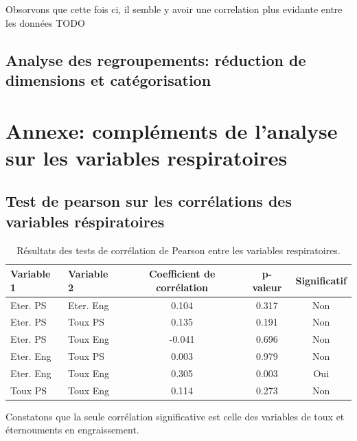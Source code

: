 \documentclass{article}
\begin{document}
Obsorvons que cette fois ci, il semble y avoir une correlation plus evidante entre les données 
TODO




\subsection{Analyse des regroupements: réduction de dimensions et catégorisation}

\newpage
\appendix

\section{Annexe: compléments de l'analyse sur les variables respiratoires}
\subsection{Test de pearson sur les corrélations des variables réspiratoires}\label{annexe:pearson}

\begin{table}[ht]
    \centering
    \begin{tabular}{llccc}
    \toprule
    \textbf{Variable 1} & \textbf{Variable 2} & \textbf{Coefficient de corrélation} & \textbf{p-valeur} & \textbf{Significatif} \\
    \midrule
    Eter. PS & Eter. Eng & 0.104 & 0.317 & Non \\
    Eter. PS & Toux PS & 0.135 & 0.191 & Non \\
    Eter. PS & Toux Eng & -0.041 & 0.696 & Non \\
    Eter. Eng & Toux PS & 0.003 & 0.979 & Non \\
    Eter. Eng & Toux Eng & 0.305 & 0.003 & Oui \\
    Toux PS & Toux Eng & 0.114 & 0.273 & Non \\
    \bottomrule
    \end{tabular}
    \caption{Résultats des tests de corrélation de Pearson entre les variables respiratoires.}\label{tab:correlation_results}
\end{table}
Constatons que la seule corrélation significative est celle des variables de toux et éternouments en engraissement. 
\end{document}
